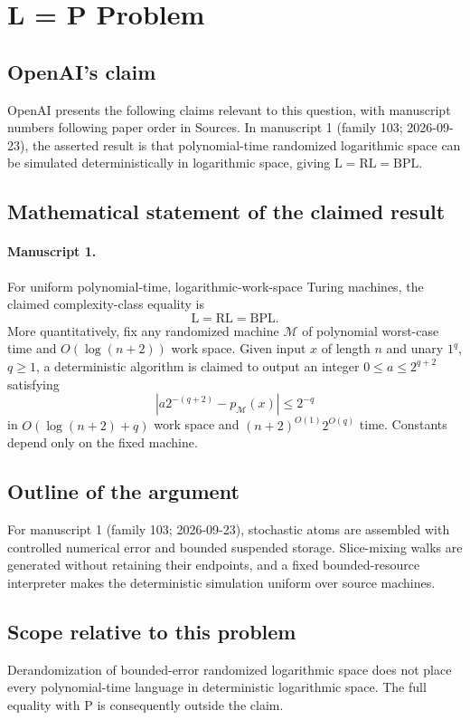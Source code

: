 \documentclass[11pt]{article}
\begin{document}
\section*{L = P Problem}

\subsection{OpenAI's claim}
OpenAI presents the following claims relevant to this question, with manuscript numbers following paper order in Sources. In manuscript 1 (family 103; 2026-09-23), the asserted result is that polynomial-time randomized logarithmic space can be simulated deterministically in logarithmic space, giving $\mathrm L=\mathrm{RL}=\mathrm{BPL}$.

\subsection{Mathematical statement of the claimed result}
\paragraph{Manuscript 1.}
For uniform polynomial-time, logarithmic-work-space Turing machines, the claimed complexity-class equality is
\[
 \mathrm L=\mathrm{RL}=\mathrm{BPL}.
\]
More quantitatively, fix any randomized machine $\mathcal M$ of polynomial worst-case time and $O(\log(n+2))$ work space. Given input $x$ of length $n$ and unary $1^q$, $q\ge1$, a deterministic algorithm is claimed to output an integer $0\le a\le2^{q+2}$ satisfying
\[
 |a2^{-(q+2)}-p_{\mathcal M}(x)|\le2^{-q}
\]
in $O(\log(n+2)+q)$ work space and $(n+2)^{O(1)}2^{O(q)}$ time. Constants depend only on the fixed machine.

\subsection{Outline of the argument}
For manuscript 1 (family 103; 2026-09-23), stochastic atoms are assembled with controlled numerical error and bounded suspended storage. Slice-mixing walks are generated without retaining their endpoints, and a fixed bounded-resource interpreter makes the deterministic simulation uniform over source machines.

\subsection{Scope relative to this problem}
Derandomization of bounded-error randomized logarithmic space does not place every polynomial-time language in deterministic logarithmic space. The full equality with $\mathrm P$ is consequently outside the claim.
\end{document}
